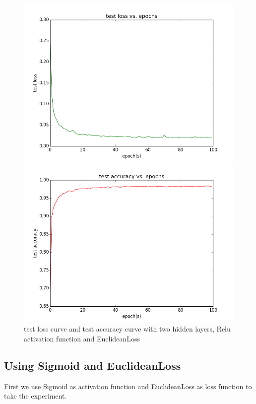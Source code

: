 \documentclass{elegantbook}
\begin{document}
\begin{figure}[!ht]
	\centering
	\begin{minipage}[t]{0.45\textwidth}
		\centering
		\includegraphics[width=\textwidth]{testloss2re}
	\end{minipage}
	\begin{minipage}[t]{0.45\textwidth}
		\centering
		\includegraphics[width=\textwidth]{testacc2re}
	\end{minipage}
	\caption{\label{testcurve21}test loss curve and test accuracy curve with two hidden layers, Relu activation function and EuclideanLoss}
\end{figure}

\subsection{Using Sigmoid and EuclideanLoss}
First we use Sigmoid as activation function and EuclideanLoss as loss function to take the experiment.
\end{document}
